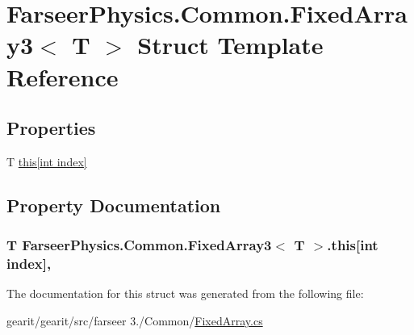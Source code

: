 \hypertarget{struct_farseer_physics_1_1_common_1_1_fixed_array3_3_01_t_01_4}{\section{Farseer\+Physics.\+Common.\+Fixed\+Array3$<$ T $>$ Struct Template Reference}
\label{struct_farseer_physics_1_1_common_1_1_fixed_array3_3_01_t_01_4}
}
\subsection*{Properties}
\begin{DoxyCompactItemize}
\item 
T \hyperlink{struct_farseer_physics_1_1_common_1_1_fixed_array3_3_01_t_01_4_ad75e3366c31a3b96ae2655cff8c11c8a}{this\mbox{[}int index\mbox{]}}
\end{DoxyCompactItemize}


\subsection{Property Documentation}
\hypertarget{struct_farseer_physics_1_1_common_1_1_fixed_array3_3_01_t_01_4_ad75e3366c31a3b96ae2655cff8c11c8a}{
\subsubsection[{this[int index]}]{\setlength{\rightskip}{0pt plus 5cm}T Farseer\+Physics.\+Common.\+Fixed\+Array3$<$ T $>$.this\mbox{[}int index\mbox{]}\hspace{0.3cm}{\ttfamily [get]}, {\ttfamily [set]}}}\label{struct_farseer_physics_1_1_common_1_1_fixed_array3_3_01_t_01_4_ad75e3366c31a3b96ae2655cff8c11c8a}


The documentation for this struct was generated from the following file\+:\begin{DoxyCompactItemize}
\item 
gearit/gearit/src/farseer 3./\+Common/\hyperlink{_fixed_array_8cs}{Fixed\+Array.\+cs}\end{DoxyCompactItemize}
